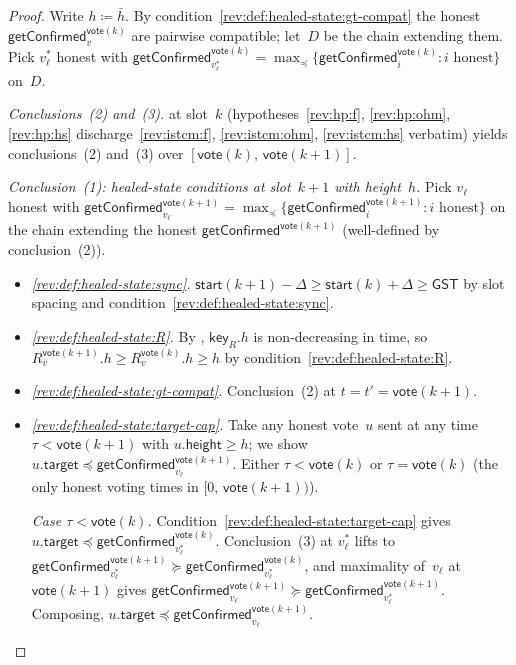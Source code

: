 \ifx\litemode\undefined\documentclass{article}\fi
\newcommand{\target}{\mathsf{target}}
\newcommand{\height}{\mathsf{height}}
\newcommand{\key}{\mathsf{key}}
\newcommand{\start}{\mathsf{start}}
\newcommand{\vote}{\mathsf{vote}}
\newcommand{\comm}[1]{\bar{#1}}
\newcommand{\getConfirmed}{\textsf{getConfirmed}\xspace}
\theoremstyle{plain}
\theoremstyle{definition}
\theoremstyle{remark}
\newcommand{\GST}{\ensuremath{\mathsf{GST}}}
\begin{document}
\begin{proof}
Write $h \coloneqq \comm{h}$. By condition~\ref{rev:def:healed-state:gt-compat} the honest $\getConfirmed_v^{\vote(k)}$ are pairwise compatible; let~$D$ be the chain extending them. Pick $v^*_\ell$ honest with $\getConfirmed_{v^*_\ell}^{\vote(k)} = \max_\preceq \{\getConfirmed_i^{\vote(k)} : i \text{ honest}\}$ on~$D$.

\emph{Conclusions~(2) and~(3).}
 at slot~$k$ (hypotheses~\ref{rev:hp:f}, \ref{rev:hp:ohm}, \ref{rev:hp:hs} discharge~\ref{rev:istcm:f}, \ref{rev:istcm:ohm}, \ref{rev:istcm:hs} verbatim) yields conclusions~(2) and~(3) over $[\vote(k),\, \vote(k+1)]$.

\emph{Conclusion~(1): healed-state conditions at slot~$k+1$ with height~$h$.}
Pick $v_\ell$ honest with $\getConfirmed_{v_\ell}^{\vote(k+1)} = \max_\preceq \{\getConfirmed_i^{\vote(k+1)} : i \text{ honest}\}$ on the chain extending the honest $\getConfirmed^{\vote(k+1)}$ (well-defined by conclusion~(2)).
\begin{itemize}
  \item \emph{\ref{rev:def:healed-state:sync}.}
  $\start(k+1) - \Delta \geq \start(k) + \Delta \geq \GST$ by slot spacing and condition~\ref{rev:def:healed-state:sync}.

  \item \emph{\ref{rev:def:healed-state:R}.}
  By , $\key_R.h$ is non-decreasing in time, so $R_v^{\vote(k+1)}.h \geq R_v^{\vote(k)}.h \geq h$ by condition~\ref{rev:def:healed-state:R}.

  \item \emph{\ref{rev:def:healed-state:gt-compat}.}
  Conclusion~(2) at $t = t' = \vote(k+1)$.

  \item \emph{\ref{rev:def:healed-state:target-cap}.}
  Take any honest vote~$u$ sent at any time $\tau < \vote(k+1)$ with $u.\height \geq h$; we show $u.\target \preceq \getConfirmed_{v_\ell}^{\vote(k+1)}$. Either $\tau < \vote(k)$ or $\tau = \vote(k)$ (the only honest voting times in $[0,\, \vote(k+1))$).

  \emph{Case $\tau < \vote(k)$.}
  Condition~\ref{rev:def:healed-state:target-cap} gives $u.\target \preceq \getConfirmed_{v^*_\ell}^{\vote(k)}$. Conclusion~(3) at $v^*_\ell$ lifts to $\getConfirmed_{v^*_\ell}^{\vote(k+1)} \succeq \getConfirmed_{v^*_\ell}^{\vote(k)}$, and maximality of~$v_\ell$ at $\vote(k+1)$ gives $\getConfirmed_{v_\ell}^{\vote(k+1)} \succeq \getConfirmed_{v^*_\ell}^{\vote(k+1)}$. Composing, $u.\target \preceq \getConfirmed_{v_\ell}^{\vote(k+1)}$.


\end{itemize}
\end{proof}
\end{document}
